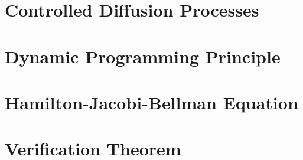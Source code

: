 \section{Controlled Diffusion Processes}
\section{Dynamic Programming Principle}
\section{Hamilton-Jacobi-Bellman Equation}
\section{Verification Theorem}